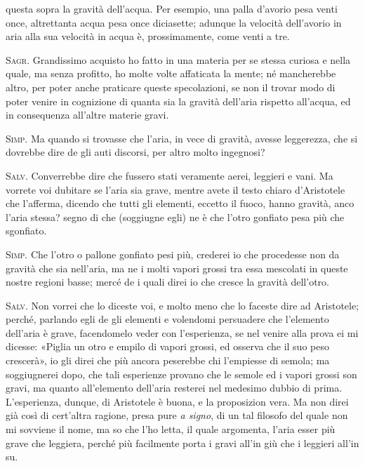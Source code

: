\documentclass[11pt,twoside,openany]{book}
\newcommand{\speaker}[1]{\textcolor{rubric}{\textsc{#1}}\space}
\begin{document}
questa sopra la gravità dell'acqua. Per esempio, una palla d'avorio pesa venti once, altrettanta acqua pesa once diciasette; adunque la velocità dell'avorio in aria alla sua velocità in acqua è, prossimamente, come venti a tre.

\speaker{Sagr.} Grandissimo acquisto ho fatto in una materia per se stessa curiosa e nella quale, ma senza profitto, ho molte volte affaticata la mente; né mancherebbe altro, per poter anche praticare queste specolazioni, se non il trovar modo di poter venire in cognizione di quanta sia la gravità dell'aria rispetto all'acqua, ed in consequenza all'altre materie gravi.

\speaker{Simp.} Ma quando si trovasse che l'aria, in vece di gravità, avesse leggerezza, che si dovrebbe dire de gli auti discorsi, per altro molto ingegnosi?

\speaker{Salv.} Converrebbe dire che fussero stati veramente aerei, leggieri e vani. Ma vorrete voi dubitare se l'aria sia grave, mentre avete il testo chiaro d'Aristotele che l'afferma, dicendo che tutti gli elementi, eccetto il fuoco, hanno gravità, anco l'aria stessa? segno di che (soggiugne egli) ne è che l'otro gonfiato pesa più che sgonfiato.

\speaker{Simp.} Che l'otro o pallone gonfiato pesi più, crederei io che procedesse non da gravità che sia nell'aria, ma ne i molti vapori grossi tra essa mescolati in queste nostre regioni basse; mercé de i quali direi io che cresce la gravità dell'otro.

\speaker{Salv.} Non vorrei che lo diceste voi, e molto meno che lo faceste dire ad Aristotele; perché, parlando egli de gli elementi e volendomi persuadere che l'elemento dell'aria è grave, facendomelo veder con l'esperienza, se nel venire alla prova ei mi dicesse: «Piglia un otro e empilo di vapori grossi, ed osserva che il suo peso crescerà», io gli direi che più ancora peserebbe chi l'empiesse di semola; ma soggiugnerei dopo, che tali esperienze provano che le semole ed i vapori grossi son gravi, ma quanto all'elemento dell'aria resterei nel medesimo dubbio di prima. L'esperienza, dunque, di Aristotele è buona, e la proposizion vera. Ma non direi già così di cert'altra ragione, presa pure \emph{a signo}, di un tal filosofo del quale non mi sovviene il nome, ma so che l'ho letta, il quale argomenta, l'aria esser più grave che leggiera, perché più facilmente porta i gravi all'in giù che i leggieri all'in su.
\end{document}
